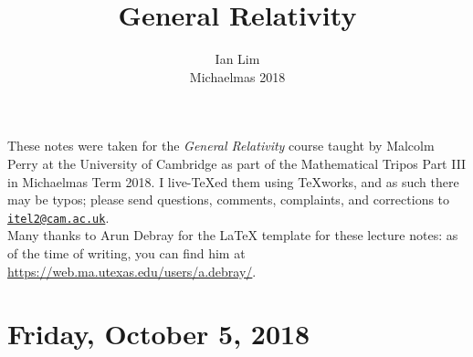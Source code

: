 \documentclass[reqno]{amsart}
\begin{document}
\title{General Relativity}
\author{Ian Lim\\ Michaelmas 2018}
\maketitle
{\small\noindent These notes were taken for the \textit{General Relativity} course taught by Malcolm Perry at the University of Cambridge as part of the Mathematical Tripos Part III in Michaelmas Term 2018. I live-\TeX ed them using TeXworks, and as such there may be typos; please send questions, comments, complaints, and corrections to 
\href{mailto:itel2@cam.ac.uk?subject=GR\%20Lecture\%20Notes}{\texttt{itel2@cam.ac.uk}}.\\
Many thanks to Arun Debray for the {\LaTeX} template for these lecture notes: as of the time of writing, you can find him at \url{https://web.ma.utexas.edu/users/a.debray/}.}

\tableofcontents
\clearpage
\section{Friday, October 5, 2018}
	
	
\end{document}
